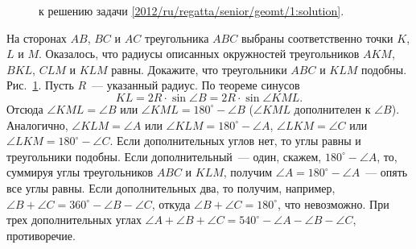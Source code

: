 \ifsolution
\begin{figure}\centering
    \caption{к решению задачи \ref{2012/ru/regatta/senior/geomt/1:solution}.}
    \label{2012/ru/regatta/senior/geomt/1:solution:fig}
\end{figure}%
\fi %

\problem
На сторонах $AB$, $BC$ и $AC$ треугольника $ABC$ выбраны соответственно точки
$K$, $L$ и $M$.
Оказалось, что радиусы описанных окружностей треугольников
$AKM$, $BKL$, $CLM$ и $KLM$ равны.
Докажите, что треугольники $ABC$ и $KLM$ подобны.
\solution
\label{2012/ru/regatta/senior/geomt/1:solution}%
Рис.~\ref{2012/ru/regatta/senior/geomt/1:solution:fig}.
Пусть $R$~--- указанный радиус.
По теореме синусов
\[
    KL = 2 R \cdot \sin \angle B = 2 R \cdot \sin \angle KML
.\]
Отсюда $\angle KML = \angle B$ или $\angle KML = 180^\circ - \angle B$
($\angle KML$ дополнителен к $\angle B$).
Аналогично,
$\angle KLM = \angle A$ или $\angle KLM = 180^\circ - \angle A$,
$\angle LKM = \angle C$ или $\angle LKM = 180^\circ - \angle C$.
Если дополнительных углов нет, то углы равны и треугольники подобны.
Если дополнительный~--- один, скажем, $180^\circ - \angle A$, то,
суммируя углы треугольников $ABC$ и $KLM$, получим
$\angle A = 180^\circ - \angle A$~--- опять все углы равны.
Если дополнительных два, то получим, например,
$\angle B + \angle C = 360^\circ - \angle B - \angle C$,
откуда $\angle B + \angle C = 180^\circ$, что невозможно.
При трех дополнительных углах
$\angle A + \angle B + \angle C = 540^\circ - \angle A - \angle B - \angle C$,
противоречие.
\endproblem
